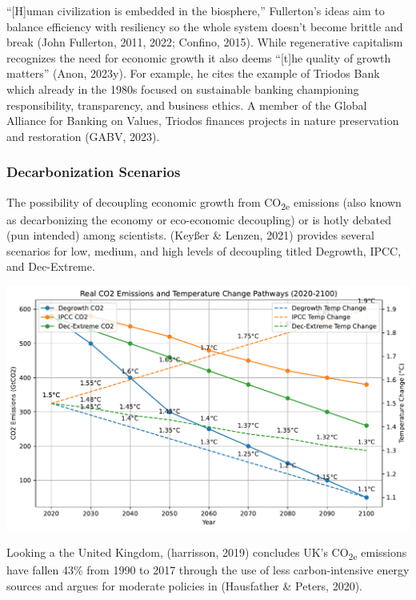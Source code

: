 \documentclass[
  letterpaper,
  DIV=11,
  numbers=noendperiod]{scrartcl}
\begin{document}
``{[}H{]}uman civilization is embedded in the biosphere,'' Fullerton's
ideas aim to balance efficiency with resiliency so the whole system
doesn't become brittle and break (John Fullerton, 2011, 2022; Confino,
2015). While regenerative capitalism recognizes the need for economic
growth it also deems ``{[}t{]}he quality of growth matters'' (Anon,
2023y). For example, he cites the example of Triodos Bank which already
in the 1980s focused on sustainable banking championing responsibility,
transparency, and business ethics. A member of the Global Alliance for
Banking on Values, Triodos finances projects in nature preservation and
restoration (GABV, 2023).

\subsubsection{Decarbonization
Scenarios}\label{decarbonization-scenarios}

The possibility of decoupling economic growth from CO\textsubscript{2e}
emissions (also known as decarbonizing the economy or eco-economic
decoupling) or is hotly debated (pun intended) among scientists. (Keyßer
\& Lenzen, 2021) provides several scenarios for low, medium, and high
levels of decoupling titled Degrowth, IPCC, and Dec-Extreme.

\includegraphics{_thesis_files/figure-pdf/cell-43-output-1.pdf}

Looking a the United Kingdom, (harrisson, 2019) concludes UK's
CO\textsubscript{2e} emissions have fallen 43\% from 1990 to 2017
through the use of less carbon-intensive energy sources and argues for
moderate policies in (Hausfather \& Peters, 2020).
\end{document}
